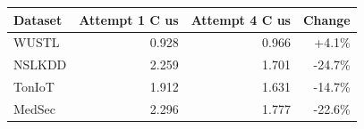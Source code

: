 \begin{tabular}{lrrr}
\toprule
Dataset & Attempt 1 C us & Attempt 4 C us & Change \\
\midrule
WUSTL & 0.928 & 0.966 & +4.1\% \\
NSLKDD & 2.259 & 1.701 & -24.7\% \\
TonIoT & 1.912 & 1.631 & -14.7\% \\
MedSec & 2.296 & 1.777 & -22.6\% \\
\bottomrule
\end{tabular}
